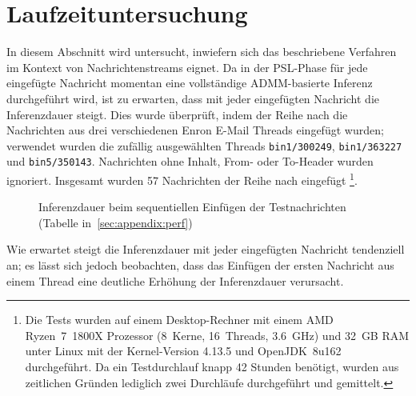 \section{Laufzeituntersuchung}%
\label{sec:evaluation:time}

In diesem Abschnitt wird untersucht, inwiefern sich das beschriebene Verfahren im Kontext von Nachrichtenstreams eignet.
Da in der PSL-Phase für jede eingefügte Nachricht momentan eine vollständige ADMM-basierte Inferenz durchgeführt wird, ist zu erwarten, dass mit jeder eingefügten Nachricht die Inferenzdauer steigt.
Dies wurde überprüft, indem der Reihe nach die Nachrichten aus drei verschiedenen Enron E-Mail Threads eingefügt wurden;
verwendet wurden die zufällig ausgewählten Threads \texttt{bin1/300249}, \texttt{bin1/363227} und \texttt{bin5/350143}.
Nachrichten ohne Inhalt, From- oder To-Header wurden ignoriert.
Insgesamt wurden 57 Nachrichten der Reihe nach eingefügt%
\footnote{Die Tests wurden auf einem Desktop-Rechner mit einem AMD Ryzen~7~1800X Prozessor (8~Kerne, 16~Threads, 3.6~GHz) und 32~GB RAM unter Linux mit der Kernel-Version 4.13.5 und OpenJDK~8u162 durchgeführt.
Da ein Testdurchlauf knapp 42 Stunden benötigt, wurden aus zeitlichen Gründen lediglich zwei Durchläufe durchgeführt und gemittelt.}.
\begin{figure}[h]
	\centering
	\caption[Inferenzdauer beim sequentiellen Einfügen der Testnachrichten]{Inferenzdauer beim sequentiellen Einfügen der Testnachrichten (Tabelle in~\ref{sec:appendix:perf})}\label{fig:evaluation:perf}
\end{figure}
Wie erwartet steigt die Inferenzdauer mit jeder eingefügten Nachricht tendenziell an; es lässt sich jedoch beobachten, dass das Einfügen der ersten Nachricht aus einem Thread eine deutliche Erhöhung der Inferenzdauer verursacht.
